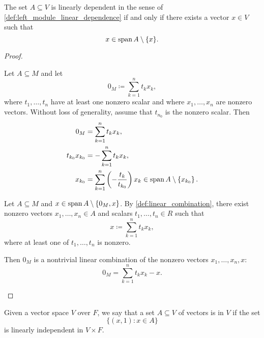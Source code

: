 \begin{proposition}\label{thm:vector_space_linear_dependence}
  The set \( A \subseteq V \) is linearly dependent in the sense of \cref{def:left_module_linear_dependence} if and only if there exists a vector \( x \in V \) such that
  \begin{equation*}
    x \in \operatorname{span}{A} \setminus \{ x \}.
  \end{equation*}
\end{proposition}
\begin{proof}
  \begin{description}
    \Implies Let \( A \subseteq M \) and let
    \begin{equation*}
      0_M \coloneqq \sum_{k=1}^n t_k x_k,
    \end{equation*}
    where \( t_1, \ldots, t_n \) have at least one nonzero scalar and where \( x_1, \ldots, x_n \) are nonzero vectors. Without loss of generality, assume that \( t_{n_0} \) is the nonzero scalar. Then
    \begin{align*}
      0_M &= \sum_{k=1}^n t_k x_k, \\
      t_{k_0} x_{k_0} &= -\sum_{k=1}^n t_k x_k, \\
      x_{k_0} &= \sum_{k=1}^n \left(-\frac {t_k} {t_{k_0}} \right) x_k \in \operatorname{span}{A} \setminus \left\{ x_{k_0} \right\}.
    \end{align*}

    \ImpliedBy Let \( A \subseteq M \) and \( x \in \operatorname{span}{A} \setminus \{ 0_M, x \} \). By \cref{def:linear_combination}, there exist nonzero vectors \( x_1, \ldots, x_n \in A \) and scalars \( t_1, \ldots, t_n \in R \) such that
    \begin{equation*}
      x \coloneqq \sum_{k=1}^n t_k x_k,
    \end{equation*}
    where at least one of \( t_1, \ldots, t_n \) is nonzero.

    Then \( 0_M \) is a nontrivial linear combination of the nonzero vectors \( x_1, \ldots, x_n, x \):
    \begin{equation*}
      0_M = \sum_{k=1}^n t_k x_k - x.
    \end{equation*}
  \end{description}
\end{proof}

\begin{definition}\label{affine_independence}
  Given a vector space \( V \) over \( F \), we say that a set \( A \subseteq V \) of vectors is  in \( V \) if the set
  \begin{equation*}
    \{ (x, 1) \colon x \in A \}
  \end{equation*}
  is linearly independent in \( V \times F \).
\end{definition}

